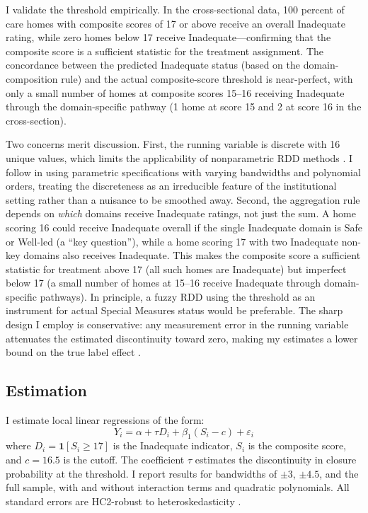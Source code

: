 \documentclass[12pt]{article}
\begin{document}
I validate the threshold empirically. In the cross-sectional data, 100 percent of care homes with composite scores of 17 or above receive an overall Inadequate rating, while zero homes below 17 receive Inadequate---confirming that the composite score is a sufficient statistic for the treatment assignment. The concordance between the predicted Inadequate status (based on the domain-composition rule) and the actual composite-score threshold is near-perfect, with only a small number of homes at composite scores 15--16 receiving Inadequate through the domain-specific pathway (1 home at score 15 and 2 at score 16 in the cross-section).

Two concerns merit discussion. First, the running variable is discrete with 16 unique values, which limits the applicability of nonparametric RDD methods \citep{lee2008randomized, kolesar2018inference}. I follow \citet{lee2008randomized} in using parametric specifications with varying bandwidths and polynomial orders, treating the discreteness as an irreducible feature of the institutional setting rather than a nuisance to be smoothed away. Second, the aggregation rule depends on \emph{which} domains receive Inadequate ratings, not just the sum. A home scoring 16 could receive Inadequate overall if the single Inadequate domain is Safe or Well-led (a ``key question''), while a home scoring 17 with two Inadequate non-key domains also receives Inadequate. This makes the composite score a sufficient statistic for treatment above 17 (all such homes are Inadequate) but imperfect below 17 (a small number of homes at 15--16 receive Inadequate through domain-specific pathways). In principle, a fuzzy RDD using the threshold as an instrument for actual Special Measures status would be preferable. The sharp design I employ is conservative: any measurement error in the running variable attenuates the estimated discontinuity toward zero, making my estimates a lower bound on the true label effect \citep{lee2008randomized}.

\subsection{Estimation}

I estimate local linear regressions of the form:
\begin{equation}
Y_i = \alpha + \tau D_i + \beta_1 (S_i - c) + \varepsilon_i
\end{equation}
where $D_i = \mathbf{1}[S_i \geq 17]$ is the Inadequate indicator, $S_i$ is the composite score, and $c = 16.5$ is the cutoff. The coefficient $\tau$ estimates the discontinuity in closure probability at the threshold. I report results for bandwidths of $\pm 3$, $\pm 4.5$, and the full sample, with and without interaction terms and quadratic polynomials. All standard errors are HC2-robust to heteroskedasticity \citep{mackinnon1985some}.
\end{document}

